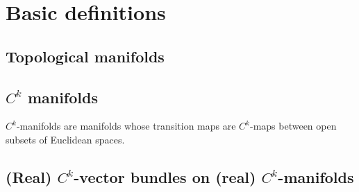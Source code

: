 \nocite{*}

% 

\section{Basic definitions}

\subsection{Topological manifolds}






\subsection{\texorpdfstring{$C^k$}{Ck} manifolds}

$C^k$-manifolds are manifolds whose transition maps are $C^k$-maps between open subsets of Euclidean spaces.









\subsection{(Real) \texorpdfstring{$C^k$}{Ck}-vector bundles on (real) \texorpdfstring{$C^k$}{Ck}-manifolds}











